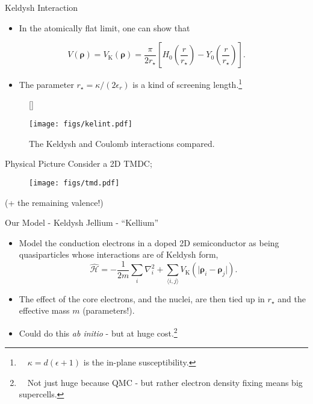 \documentclass[10pt, pdf, hyperref={draft}, usenames, dvipsnames]{beamer}
\begin{document}

\begin{frame}{Keldysh Interaction}
  \begin{itemize}
    \item In the atomically flat limit, one can show that
  \end{itemize}
\begin{equation}
  V({\boldsymbol\rho}) = V_{\text{K}}({\boldsymbol\rho}) =
  \dfrac{\pi}{2r_{\star}} \left[ H_{0}\left(\frac{r}{r_{\star}}\right) -
  Y_{0}\left(\frac{r}{r_{\star}}\right) \right].
\end{equation}
\begin{itemize}
  \item The parameter $r_{\star} = \kappa/(2\epsilon_{r})$ is a kind of
  screening length.\footnote{~~$\kappa=d(\epsilon+1)$ is the in-plane
  susceptibility.}
\end{itemize}

\begin{figure}[H]
  [\FBwidth]
  {\caption{The Keldysh and Coulomb interactions compared.}\label{fig:kelint}}
  {\texttt{[image: figs/kelint.pdf]}}
\end{figure}
\end{frame}

\begin{frame}{Physical Picture}
Consider a 2D TMDC;
\begin{figure}[H]
  \centering
  \texttt{[image: figs/tmd.pdf]}
\end{figure}
\begin{center}
  (+ the remaining valence!)
\end{center}
\end{frame}


\begin{frame}{Our Model - Keldysh Jellium - ``Kellium''}
  \begin{itemize}
    \item Model the conduction electrons in a doped 2D semiconductor as being
    quasiparticles whose interactions are of Keldysh form,
    \begin{equation}
      \mathcal{\hat H} = -\dfrac{1}{2m} \sum_{i} \nabla_{i}^{2} + \sum_{\langle
      i,j \rangle} V_{\text{K}}(\lvert {\boldsymbol\rho}_{i}-{\boldsymbol\rho}_{j} \rvert).
    \end{equation}
    \item The effect of the core electrons, and the nuclei, are then tied up in
    $r_{\star}$ and the effective mass $m$ (parameters!).
    \item Could do this \textit{ab initio} - but at huge cost.\footnote{~~Not
    just huge because QMC - but rather electron density fixing means big
    supercells.}
  \end{itemize}
\end{frame}
\end{document}
